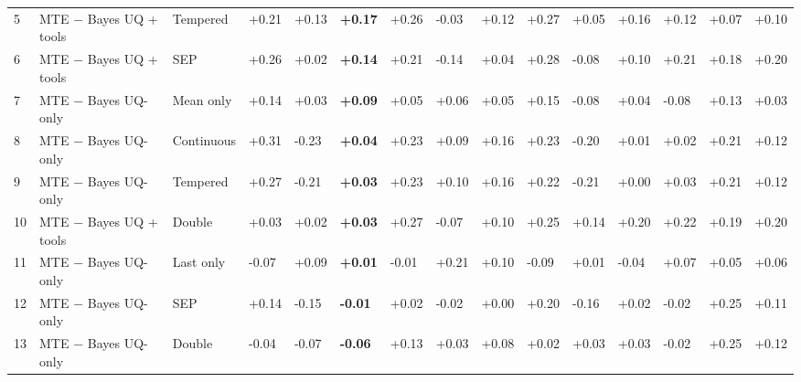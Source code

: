 \documentclass[10pt,a4paper]{article}
\begin{document}
\begin{longtable}{@{}R{8.000mm}L{38.000mm}L{30.000mm}C{14.000mm}C{14.000mm}C{14.000mm}C{14.000mm}C{14.000mm}C{14.000mm}C{14.000mm}C{14.000mm}C{14.000mm}C{14.000mm}C{14.000mm}C{14.000mm}@{}}
5 & MTE \ensuremath{-} Bayes UQ + tools & Tempered & +0.21 & +0.13 & \textbf{+0.17} & +0.26 & -0.03 & +0.12 & +0.27 & +0.05 & +0.16 & +0.12 & +0.07 & +0.10 \\
6 & MTE \ensuremath{-} Bayes UQ + tools & SEP & +0.26 & +0.02 & \textbf{+0.14} & +0.21 & -0.14 & +0.04 & +0.28 & -0.08 & +0.10 & +0.21 & +0.18 & +0.20 \\
7 & MTE \ensuremath{-} Bayes UQ-only & Mean only & +0.14 & +0.03 & \textbf{+0.09} & +0.05 & +0.06 & +0.05 & +0.15 & -0.08 & +0.04 & -0.08 & +0.13 & +0.03 \\
8 & MTE \ensuremath{-} Bayes UQ-only & Continuous & +0.31 & -0.23 & \textbf{+0.04} & +0.23 & +0.09 & +0.16 & +0.23 & -0.20 & +0.01 & +0.02 & +0.21 & +0.12 \\
9 & MTE \ensuremath{-} Bayes UQ-only & Tempered & +0.27 & -0.21 & \textbf{+0.03} & +0.23 & +0.10 & +0.16 & +0.22 & -0.21 & +0.00 & +0.03 & +0.21 & +0.12 \\
10 & MTE \ensuremath{-} Bayes UQ + tools & Double & +0.03 & +0.02 & \textbf{+0.03} & +0.27 & -0.07 & +0.10 & +0.25 & +0.14 & +0.20 & +0.22 & +0.19 & +0.20 \\
11 & MTE \ensuremath{-} Bayes UQ-only & Last only & -0.07 & +0.09 & \textbf{+0.01} & -0.01 & +0.21 & +0.10 & -0.09 & +0.01 & -0.04 & +0.07 & +0.05 & +0.06 \\
12 & MTE \ensuremath{-} Bayes UQ-only & SEP & +0.14 & -0.15 & \textbf{-0.01} & +0.02 & -0.02 & +0.00 & +0.20 & -0.16 & +0.02 & -0.02 & +0.25 & +0.11 \\
13 & MTE \ensuremath{-} Bayes UQ-only & Double & -0.04 & -0.07 & \textbf{-0.06} & +0.13 & +0.03 & +0.08 & +0.02 & +0.03 & +0.03 & -0.02 & +0.25 & +0.12 \\
\end{longtable}
\endgroup
\Needspace{40mm}
\Needspace{40mm}
\end{document}
